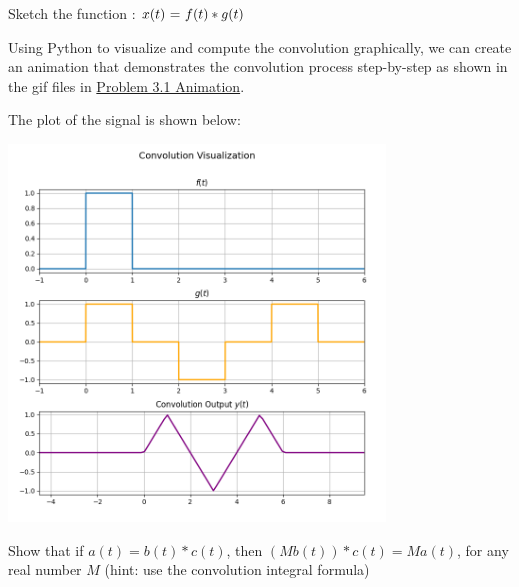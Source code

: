 \documentclass[a4paper, 10pt]{article}
\begin{document}
\begin{subproblems}[start=1]
    \item Sketch the function : \( x(t)$ = $f(t) * g(t) \)
\end{subproblems}

\begin{solution}
Using Python to visualize and compute the convolution graphically,
we can create an animation that demonstrates the convolution process step-by-step
as shown in the gif files in \href{https://github.com/patthadon-p/CEDT-2110203-CEM-II/blob/main/signal/homework-2/images/problem_3_1.gif}{Problem 3.1 Animation}.

\vspace{3mm}

\newpage
The plot of the signal is shown below:
\begin{center}
    \includegraphics[width=0.75\textwidth]{images/problem_3_1_snapshot.png}
\end{center}
\end{solution}


\begin{subproblems}[start=2]
    \item Show that if \( a(t) = b(t) * c(t) \), then \( (Mb(t))*c(t) = Ma(t) \), for any real number \( M \) (hint: use the convolution integral formula)
\end{subproblems}
\end{document}
